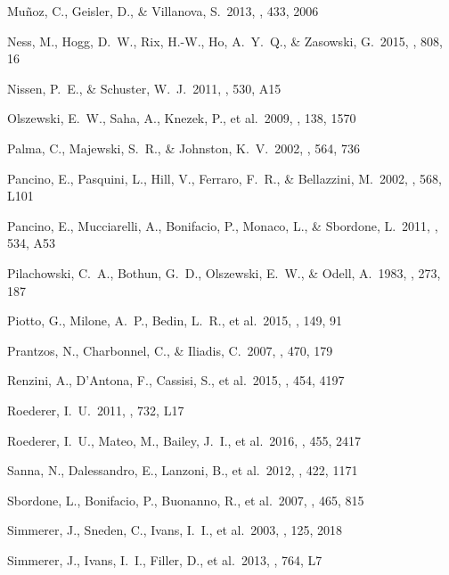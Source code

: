 \documentclass[12pt,preprint]{emulateapj}
\begin{document}
\begin{thebibliography}{}
 Mu{\~n}oz, C., Geisler, D., \& Villanova, S.\ 2013, \mnras, 433, 2006

 Ness, M., Hogg, D.~W., Rix, H.-W., Ho, A.~Y.~Q., \& Zasowski, G.\ 2015, \apj, 808, 16

 Nissen, P.~E., \& Schuster, W.~J.\ 2011, \aap, 530, A15 

 Olszewski, E.~W., Saha, A., Knezek, P., et al.\ 2009, \aj, 138, 1570

 Palma, C., Majewski, S.~R., \& Johnston, K.~V.\ 2002, \apj, 564, 736

 Pancino, E., Pasquini, L., Hill, V., Ferraro, F.~R., \& Bellazzini, M.\ 2002, \apjl, 568, L101

 Pancino, E., Mucciarelli, A., Bonifacio, P., Monaco, L., \& Sbordone, L.\ 2011, \aap, 534, A53

 Pilachowski, C.~A., Bothun, G.~D., Olszewski, E.~W., \& Odell, A.\ 1983, \apj, 273, 187

 Piotto, G., Milone, A.~P., Bedin, L.~R., et al.\ 2015, \aj, 149, 91

 Prantzos, N., Charbonnel, C., \& Iliadis, C.\ 2007, \aap, 470, 179

 Renzini, A., D'Antona, F., Cassisi, S., et al.\ 2015, \mnras, 454, 4197

 Roederer, I.~U.\ 2011, \apjl, 732, L17

 Roederer, I.~U., Mateo, M., Bailey, J.~I., et al.\ 2016, \mnras, 455, 2417

 Sanna, N., Dalessandro, E., Lanzoni, B., et al.\ 2012, \mnras, 422, 1171

 Sbordone, L., Bonifacio, P., Buonanno, R., et al.\ 2007, \aap, 465, 815

 Simmerer, J., Sneden, C., Ivans, I.~I., et al.\ 2003, \aj, 125, 2018

 Simmerer, J., Ivans, I.~I., Filler, D., et al.\ 2013, \apjl, 764, L7


\end{thebibliography}
\end{document}
